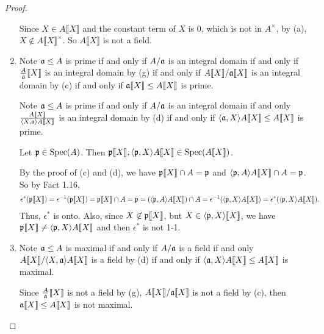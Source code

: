 \begin{proof}
\begin{enumerate}
            Since $X \in A\llbracket X \rrbracket$ and the constant term of $X$ is 0, which is not in $A^\times$, by (a), $X \not \in A\llbracket X \rrbracket^\times$. So $A\llbracket X \rrbracket$ is not a field.
        \item 
            Note $\mathfrak{a} \leq A$ is prime if and only if $A/\mathfrak{a}$ is an integral domain if and only if $\frac{A}{\mathfrak{a}}\llbracket X \rrbracket$ is an integral domain by (g) if and only if $A\llbracket X \rrbracket/\mathfrak{a} \llbracket X \rrbracket$ is an integral domain by (c) if and only if $\mathfrak{a}\llbracket X \rrbracket \leq A \llbracket X \rrbracket$ is prime. \par 
            Note $\mathfrak{a} \leq A$ is prime if and only if $A/\mathfrak{a}$ is an integral domain if and only $\frac{A\llbracket X \rrbracket}{\langle X,\mathfrak{a} \rangle A\llbracket X \rrbracket}$ is an integral domain by (d) if and only if $\langle \mathfrak{a},X \rangle A\llbracket X \rrbracket \leq A\llbracket X \rrbracket$ is prime. \par
            Let $\mathfrak{p} \in \operatorname{Spec}(A)$. Then $\mathfrak{p}\llbracket X \rrbracket, \langle \mathfrak{p},X \rangle A\llbracket X \rrbracket \in \operatorname{Spec}(A\llbracket X \rrbracket)$. \par 
            By the proof of (c) and (d), we have $\mathfrak{p} \llbracket X \rrbracket \cap A = \mathfrak{p}$ and $\langle \mathfrak{p},A \rangle A\llbracket X \rrbracket \cap A = \mathfrak{p}$. So by Fact 1.16,
            \begin{align*}
                \epsilon^*(\mathfrak{p} \llbracket X \rrbracket) & = \epsilon^{-1}(\mathfrak{p} \llbracket X \rrbracket) = \mathfrak{p} \llbracket X \rrbracket \cap A = \mathfrak{p} = (\langle \mathfrak{p},A \rangle A\llbracket X \rrbracket) \cap A = \epsilon^{-1}(\langle \mathfrak{p},X \rangle A\llbracket X \rrbracket) = \epsilon^*(\langle \mathfrak{p},X \rangle A\llbracket X \rrbracket). 
            \end{align*}
            Thus, $\epsilon^*$ is onto. Also, since $X \not \in \mathfrak{p} \llbracket X \rrbracket$, but $X \in \langle \mathfrak{p},X \rangle \llbracket X \rrbracket$, we have $\mathfrak{p}\llbracket X \rrbracket \neq \langle \mathfrak{p},X \rangle A\llbracket X \rrbracket$ and then $\epsilon^*$ is not 1-1.
        \item 
            Note $\mathfrak{a} \leq A$ is maximal if and only if $A/\mathfrak{a}$ is a field if and only $A\llbracket X \rrbracket / \langle X,\mathfrak{a} \rangle A\llbracket X \rrbracket$ is a field by (d) if and only if $\langle \mathfrak{a},X \rangle A\llbracket X \rrbracket \leq A\llbracket X \rrbracket$ is maximal. \par 
            Since $\frac{A}{\mathfrak{a}}\llbracket X \rrbracket$ is not a field by (g), $A\llbracket X \rrbracket / \mathfrak{a} \llbracket X \rrbracket$ is not a field by (c), then $\mathfrak{a} \llbracket X \rrbracket \leq A\llbracket X \rrbracket$ is not maximal. 

\end{enumerate}
\end{proof}
